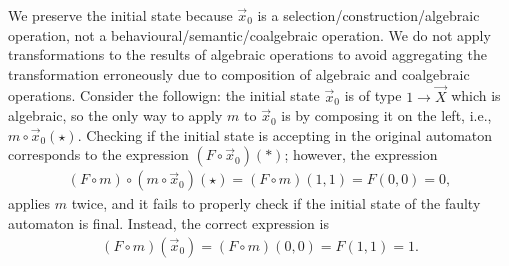 We preserve the initial state because $\vec{x}_0$ is a selection/construction/algebraic operation, not a behavioural/semantic/coalgebraic operation. We do not apply transformations to the results of algebraic operations to avoid aggregating the transformation erroneously due to composition of algebraic and coalgebraic operations. Consider the followign: the initial state $\vec{x}_0$ is of type $1\rightarrow\vec{X}$ which is algebraic, so the only way to apply $m$ to $\vec{x}_0$ is by composing it on the left, i.e., $m\circ \vec{x}_0(\star)$. Checking if the initial state is accepting in the original automaton corresponds to the expression $(F\circ\vec{x}_0)(*)$; however, the expression
\begin{align*}
    (F\circ m)\circ (m\circ\vec{x}_0)(\star)= (F\circ m)(1,1)=F(0,0)=0,
\end{align*}
applies $m$ twice, and it fails to properly check if the initial state of the faulty automaton is final. Instead, the correct expression is 
\begin{align*}
    (F\circ m)(\vec{x}_0)= (F\circ m)(0,0)=F(1,1)=1.
\end{align*}

